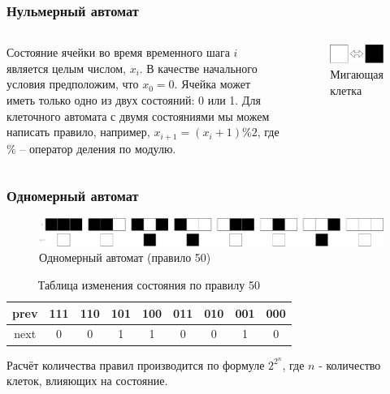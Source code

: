 \documentclass{beamer}
\begin{document}
    \begin{frame}
        \frametitle{Нульмерный автомат}
        \begin{columns}[c] %
            Состояние ячейки во время временного шага \(i\) является целым числом, \(x_i\). В качестве начального условия предположим, что \(x_0 = 0\). Ячейка может иметь только одно из двух состояний: 0 или 1. Для клеточного автомата с двумя состояниями мы можем написать правило, например, \(x_{i + 1} = (x_i + 1) \% 2\), где \(\%\) – оператор деления по модулю.
            \begin{figure}
                \begin{center}
                    \includegraphics[width=\linewidth]{pict/zeroD}
                \end{center}
                \caption{Мигающая клетка}
                \label{fig:zeroD}
            \end{figure}
        \end{columns}
    \end{frame}

    \begin{frame}
        \frametitle{Одномерный автомат}
        \begin{figure}
            \begin{center}
                \includegraphics[width=\linewidth]{pict/rule50}
            \end{center}
            \caption{Одномерный автомат (правило 50)}
            \label{fig:rule50}
        \end{figure}
        
        \begin{table}
            \begin{center}
                \begin{tabular}{ccccccccc}
                    prev & 111 & 110 & 101 & 100 & 011 & 010 & 001 & 000\\
                    \hline
                    next &  0  &  0  &  1  &  1  &  0  &  0  &  1  &  0
                \end{tabular}
            \end{center}
            \caption{Таблица изменения состояния по правилу 50}
            \label{tab:rule50}
        \end{table}
        Расчёт количества правил производится по формуле \(2^{2^{n}}\), где \(n\) - количество клеток, влияющих на состояние.
    \end{frame}
\end{document}
